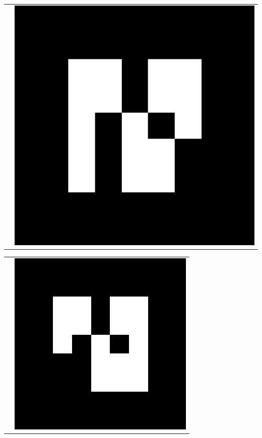 \documentclass{article}
\makeatletter
\newenvironment{Marker}[1]
    {\begin{center}
	    \vspace*{2cm}
	    \begin{tabular*}{\textwidth}{@{\extracolsep{\fill} } l r}
	    \rotatebox{90}{#1} &
    }
    { 
    \end{tabular*} 
	    \vspace*{2cm}
    \end{center}
    }
\makeatother
\begin{document}
\begin{Marker}{UPPERARM}
    \centering
    \includegraphics[width=13cm]{MarkerData_2}
\end{Marker}

\begin{Marker}{FOREARM}
    \centering
    \includegraphics[width=9cm]{MarkerData_6}
\end{Marker}

\printbibliography
\end{document}
